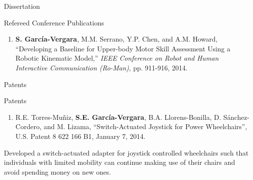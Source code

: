 \documentclass{resume} %
\newcommand{\sectionspace}{\vspace{3mm}}
\newcommand{\Sergio}{\textbf{S. Garc\'{i}a-Vergara}}
\begin{document}
\begin{rSection}{Dissertation}
\begin{rSubsection}{Refereed Conference Publications}{}{}{}
\begin{enumerate}
\item \Sergio, M.M. Serrano, Y.P. Chen, and A.M. Howard, ``Developing a Baseline
  for Upper-body Motor Skill Assessment Using a Robotic Kinematic Model,''
  \textit{IEEE Conference on Robot and Human Interactive Communication
    (Ro-Man)}, pp. 911-916, 2014.


\end{enumerate}
\end{rSubsection}

\fi

\end{rSection}










\sectionspace

\begin{rSection}{Patents}

\begin{rSubsection}{Patents}{}{}{}
\item
\begin{enumerate}
\item R.E. Torres-Mu\~{n}iz, \textbf{S.E. Garc\'{i}a-Vergara},
  B.A. Llorens-Bonilla, D. S\'{a}nchez-Cordero, and M. Lizama, ``Switch-Actuated
  Joystick for Power Wheelchairs'', U.S. Patent 8 622 166 B1, January 7, 2014.
\end{enumerate}

Developed a switch-actuated adapter for joystick controlled wheelchairs such
that individuals with limited mobility can continue making use of their chairs
and avoid spending money on new ones.

\end{rSubsection}
\end{rSection}







\iffalse
\sectionspace
\begin{rSection}{References}
Available upon request.
\end{rSection}
\fi


\end{document}
